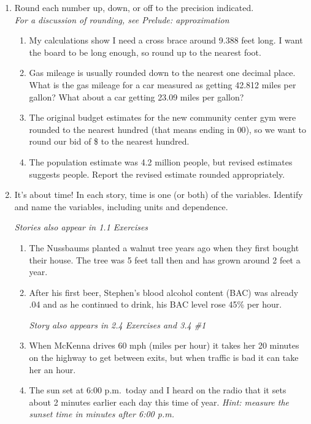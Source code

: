 \begin{enumerate}
\item  Round each number up, down, or off to the precision indicated. \\  \emph{For a discussion of rounding, see Prelude:  approximation}
\begin{enumerate}
\item My calculations show I need a cross brace around 9.388 feet long. I want the board to be long enough, so round up to the nearest foot. \vfill
\item  Gas mileage is usually rounded down to the nearest one decimal place.  What is the gas mileage for a car measured as getting 42.812 miles per gallon?  What about a car getting 23.09 miles per gallon? \vfill
\item  The original budget estimates for the new community center gym were rounded to the nearest hundred (that means ending in $00$), so we want to round our bid of \$ to the nearest hundred.   \vfill
\item The population estimate was 4.2 million people, but revised estimates suggests  people.  Report the revised estimate rounded appropriately. \vfill
\end{enumerate}

\newpage %

\item  It's about time!  In each story, time is one (or both) of the variables.  Identify and name the variables, including units and dependence.  

\hfill \emph{Stories also appear in 1.1 Exercises}
\begin{enumerate}
\item The Nussbaums planted a walnut tree years ago when they first bought their house.  The tree was 5 feet tall then and has grown around 2 feet a year. \vfill
\item After his first beer, Stephen's blood alcohol content (BAC) was already .04 and as he continued to drink, his BAC level rose 45\% per hour. 

\hfill \emph{Story also appears in 2.4 Exercises and 3.4 \#1} 
 \vfill
\item When McKenna drives 60 mph (miles per hour) it takes her 20 minutes on the highway to get between exits, but when traffic is bad it can take her an hour.\vfill
\item The sun set at 6:00 p.m.\ today and I heard on the radio that it sets about 2 minutes earlier each day this time of year.  \emph{Hint: measure the sunset time in minutes after 6:00 p.m.}\vfill
\end{enumerate} 

\end{enumerate}



